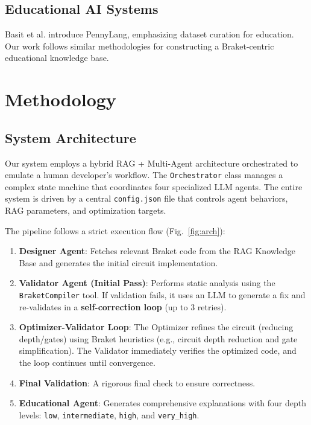\documentclass[runningheads]{llncs}
\begin{document}
\subsection{Educational AI Systems}
Basit et al. \cite{basit2025pennylangpioneeringllmbasedquantum} introduce PennyLang, emphasizing dataset curation for education. Our work follows similar methodologies for constructing a Braket-centric educational knowledge base.

\section{Methodology}

\subsection{System Architecture}
Our system employs a hybrid RAG + Multi-Agent architecture orchestrated to emulate a human developer's workflow. The \texttt{Orchestrator} class manages a complex state machine that coordinates four specialized LLM agents. The entire system is driven by a central \texttt{config.json} file that controls agent behaviors, RAG parameters, and optimization targets.

The pipeline follows a strict execution flow (Fig.~\ref{fig:arch}):
\begin{enumerate}
    \item \textbf{Designer Agent}: Fetches relevant Braket code from the RAG Knowledge Base and generates the initial circuit implementation.
    \item \textbf{Validator Agent (Initial Pass)}: Performs static analysis using the \texttt{BraketCompiler} tool. If validation fails, it uses an LLM to generate a fix and re-validates in a \textbf{self-correction loop} (up to 3 retries).
    \item \textbf{Optimizer-Validator Loop}: The Optimizer refines the circuit (reducing depth/gates) using Braket heuristics (e.g., circuit depth reduction and gate simplification). The Validator immediately verifies the optimized code, and the loop continues until convergence.
    \item \textbf{Final Validation}: A rigorous final check to ensure correctness.
    \item \textbf{Educational Agent}: Generates comprehensive explanations with four depth levels: \texttt{low}, \texttt{intermediate}, \texttt{high}, and \texttt{very\_high}.
\end{enumerate}
\end{document}
